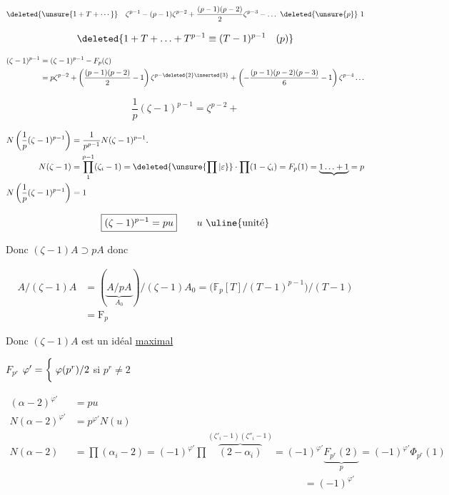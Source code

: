 \[
\deleted{\unsure{1+T+\cdots}}\quad\zeta^{p-1}-(p-1)\zeta^{p-2}+\frac{(p-1)(p-2)}2\zeta^{p-3}-\ldots\ \deleted{\unsure{p}}\ 1
\]

\[
\deleted{1+T+\ldots+T^{p-1}\equiv(T-1)^{p-1}\quad(p)}
\]

\[
\begin{aligned}
(\zeta-1)^{p-1}&=(\zeta-1)^{p-1}-F_p(\zeta)\\
&=p\zeta^{p-2}+\left(\frac{(p-1)(p-2)}2-1\right)\zeta^{p-\deleted{2}\inserted{3}}+
\left(-\frac{(p-1)(p-2)(p-3)}6-1\right)\zeta^{p-4}\ldots
\end{aligned}
\]


\[
\frac1p(\zeta-1)^{p-1}=\zeta^{p-2}+
\]

\[
\begin{aligned}
N\left(\frac1p(\zeta-1)^{p-1}\right)&=\frac1{p^{p-1}}N(\zeta-1)^{p-1}.\\
N(\zeta-1)&=\prod_1^{p-1}(\zeta_i-1)=\deleted{\unsure{\prod|\varepsilon}}\cdot\prod(1-\zeta_i)=F_p(1)=\underbrace{1\ldots+1}=p\\
N\left(\frac1p(\zeta-1)^{p-1}\right)&=1
\end{aligned}
\]

\[
\boxed{(\zeta-1)^{p-1}=pu}\qquad u\ \text{\uline{unité}}
\]

Donc $(\zeta-1)A\supset pA$  donc

\[
\begin{aligned}
A/(\zeta-1)A&=(\underbrace{A/pA}_{A_0})/(\zeta-1)A_0=\bigl(\mathbb F_p[T]/(T-1)^{p-1}\bigr)/(T-1)\\
&=\mathrm F_p
\end{aligned}
\]

Donc $(\zeta-1)A$ est un idéal \uline{maximal}



$F_{p^r}$ \qquad $\varphi'=\left\{\vphantom{\dfrac12}\right.\varphi(p^r)/2$ si $p^r\ne2$

\[
\begin{aligned}
(\alpha-2)^{\varphi'}&=pu\\
N(\alpha-2)^{\varphi'}&=p^{\varphi'}N(u)\\
N(\alpha-2)&=\prod(\alpha_i-2)=(-1)^{\varphi'}\prod\overbrace{(2-\alpha_i)}^{(\zeta'_i-1)(\zeta''_i-1)}
=(-1)^{\varphi'}\underbrace{F_{p^r}(2)}_{p}=(-1)^{\varphi'}\Phi_{p^r}(1)\\
&\hspace{23em}=(-1)^{\varphi'}
\end{aligned}
\]

